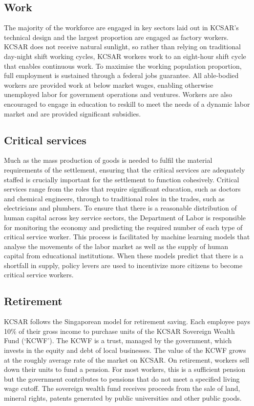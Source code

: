 \documentclass[fleqn,10pt]{Stylesheet} %
\begin{document}
\subsection{Work}
The majority of the workforce are engaged in key sectors laid out in KCSAR's technical design and the largest proportion are engaged as factory workers. KCSAR does not receive natural sunlight, so rather than relying on traditional day-night shift working cycles, KCSAR workers work to an eight-hour shift cycle that enables continuous work. To maximise the working population proportion, full employment is sustained through a federal jobs guarantee. All able-bodied workers are provided work at below market wages, enabling otherwise unemployed labor for government operations and ventures. Workers are also encouraged to engage in education to reskill to meet the needs of a dynamic labor market and are provided significant subsidies.   

\subsection{Critical services}
\label{sec:crtical_services}
Much as the mass production of goods is needed to fulfil the material requirements of the settlement, ensuring that the critical services are adequately staffed is crucially important for the settlement to function cohesively. Critical services range from the roles that require significant education, such as doctors and chemical engineers, through to traditional roles in the trades, such as electricians and plumbers. To ensure that there is a reasonable distribution of human capital across key service sectors, the Department of Labor is responsible for monitoring the economy and predicting the required number of each type of critical service worker. This process is facilitated by machine learning models that analyse the movements of the labor market as well as the supply of human capital from educational institutions. When these models predict that there is a shortfall in supply, policy levers are used to incentivize more citizens to become critical service workers.

\subsection{Retirement}
KCSAR follows the Singaporean model for retirement saving. Each employee pays 10\% of their gross income to purchase units of the KCSAR Sovereign Wealth Fund (‘KCWF’). The KCWF is a trust, managed by the government, which invests in the equity and debt of local businesses. The value of the KCWF grows at the roughly average rate of the market on KCSAR. On retirement, workers sell down their units to fund a pension. For most workers, this is a sufficient pension but the government contributes to pensions that do not meet a specified living wage cutoff. The sovereign wealth fund receives proceeds from the sale of land, mineral rights, patents generated by public universities and other public goods.
\end{document}
